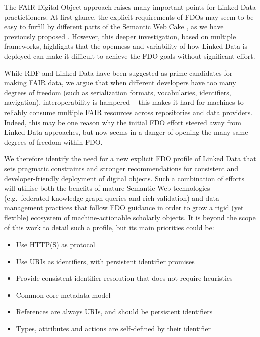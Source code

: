 \documentclass[fleqn,10pt,NOlineno]{wlpeerjlua}
\providecommand{\tightlist}{%
  \setlength{\itemsep}{0pt}\setlength{\parskip}{0pt}}
\begin{document}
The FAIR Digital Object approach raises many important points for Linked Data practictioners.
At first glance, the explicit requirements of FDOs may seem to be easy to furfill by different parts of the Semantic Web Cake \autocite[][slide 10]{SemanticWebXML2000}, as we have previously proposed \autocite{10.3897/rio.8.e94501}.
However, this deeper investigation, based on multiple frameworks, highlights that the openness and variability of how Linked Data is deployed can make it difficult to achieve the FDO goals without significant effort.

While RDF and Linked Data have been suggested as prime candidates for making FAIR data, we argue that when different developers have too many degrees of freedom (such as serialization formats, vocabularies, identifiers, navigation), interoperability is hampered -- this makes it hard for machines to reliably consume multiple FAIR resources across repositories and data providers. 
Indeed, this may be one reason why the initial FDO effort steered away from Linked Data approaches, but now seems in a danger of opening the many same degrees of freedom within FDO.

We therefore identify the need for a new explicit FDO profile of Linked Data that sets pragmatic constraints and stronger recommendations for consistent and developer-friendly deployment of digital objects. 
Such a combination of efforts will utillise both the benefits of mature Semantic Web technologies (e.g.~federated knowledge graph queries and rich validation) and data management practices that follow FDO guidance in order to grow a rigid (yet flexible) ecosystem of machine-actionable scholarly objects. 
It is beyond the scope of this work to detail such a profile, but its main priorities could be:

\begin{itemize}
  \tightlist
  \item Use HTTP(S) as protocol
  \item Use URIs as identifiers, with persistent identifier promises
  \item Provide consistent identifier resolution that does not require heuristics
  \item Common core metadata model
  \item References are always URIs, and should be persistent identifiers
  \item Types, attributes and actions are self-defined by their identifier
\end{itemize}
\end{document}
